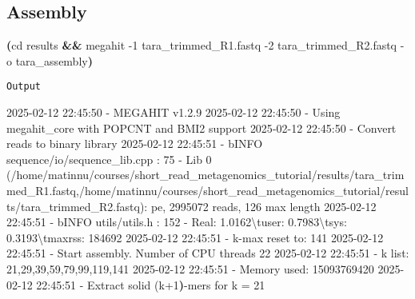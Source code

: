 \documentclass[
  letterpaper,
  DIV=11,
  numbers=noendperiod]{scrartcl}
\newenvironment{Shaded}{\begin{snugshade}}{\end{snugshade}}
\newcommand{\AttributeTok}[1]{\textcolor[rgb]{0.40,0.45,0.13}{#1}}
\newcommand{\BuiltInTok}[1]{\textcolor[rgb]{0.00,0.23,0.31}{#1}}
\newcommand{\ErrorTok}[1]{\textcolor[rgb]{0.68,0.00,0.00}{#1}}
\newcommand{\ExtensionTok}[1]{\textcolor[rgb]{0.00,0.23,0.31}{#1}}
\newcommand{\KeywordTok}[1]{\textcolor[rgb]{0.00,0.23,0.31}{\textbf{#1}}}
\newcommand{\NormalTok}[1]{\textcolor[rgb]{0.00,0.23,0.31}{#1}}
\newcommand{\StringTok}[1]{\textcolor[rgb]{0.13,0.47,0.30}{#1}}
\begin{document}
\subsection{Assembly}\label{assembly}

\begin{Shaded}
\begin{Highlighting}[]
\KeywordTok{(}\BuiltInTok{cd}\NormalTok{ results }\KeywordTok{\&\&} \ExtensionTok{megahit} \AttributeTok{{-}1}\NormalTok{ tara\_trimmed\_R1.fastq }\AttributeTok{{-}2}\NormalTok{ tara\_trimmed\_R2.fastq }\AttributeTok{{-}o}\NormalTok{ tara\_assembly}\KeywordTok{)}
\end{Highlighting}
\end{Shaded}

\texttt{Output}

\begin{Shaded}
\begin{Highlighting}[]
\ExtensionTok{2025{-}02{-}12}\NormalTok{ 22:45:50 }\AttributeTok{{-}}\NormalTok{ MEGAHIT v1.2.9}
\ExtensionTok{2025{-}02{-}12}\NormalTok{ 22:45:50 }\AttributeTok{{-}}\NormalTok{ Using megahit\_core with POPCNT and BMI2 support}
\ExtensionTok{2025{-}02{-}12}\NormalTok{ 22:45:50 }\AttributeTok{{-}}\NormalTok{ Convert reads to binary library}
\ExtensionTok{2025{-}02{-}12}\NormalTok{ 22:45:51 }\AttributeTok{{-}}\NormalTok{ b}\StringTok{\textquotesingle{}INFO  sequence/io/sequence\_lib.cpp  :   75 {-} Lib 0 (/home/matinnu/courses/short\_read\_metagenomics\_tutorial/results/tara\_trimmed\_R1.fastq,/home/matinnu/courses/short\_read\_metagenomics\_tutorial/results/tara\_trimmed\_R2.fastq): pe, 2995072 reads, 126 max length\textquotesingle{}}
\ExtensionTok{2025{-}02{-}12}\NormalTok{ 22:45:51 }\AttributeTok{{-}}\NormalTok{ b}\StringTok{\textquotesingle{}INFO  utils/utils.h                 :  152 {-} Real: 1.0162\textbackslash{}tuser: 0.7983\textbackslash{}tsys: 0.3193\textbackslash{}tmaxrss: 184692\textquotesingle{}}
\ExtensionTok{2025{-}02{-}12}\NormalTok{ 22:45:51 }\AttributeTok{{-}}\NormalTok{ k{-}max reset to: 141 }
\ExtensionTok{2025{-}02{-}12}\NormalTok{ 22:45:51 }\AttributeTok{{-}}\NormalTok{ Start assembly. Number of CPU threads 22 }
\ExtensionTok{2025{-}02{-}12}\NormalTok{ 22:45:51 }\AttributeTok{{-}}\NormalTok{ k list: 21,29,39,59,79,99,119,141 }
\ExtensionTok{2025{-}02{-}12}\NormalTok{ 22:45:51 }\AttributeTok{{-}}\NormalTok{ Memory used: 15093769420}
\ExtensionTok{2025{-}02{-}12}\NormalTok{ 22:45:51 }\AttributeTok{{-}}\NormalTok{ Extract solid }\ErrorTok{(}\ExtensionTok{k+1}\KeywordTok{)}\ExtensionTok{{-}mers}\NormalTok{ for k = 21 }

\end{Highlighting}
\end{Shaded}
\end{document}
